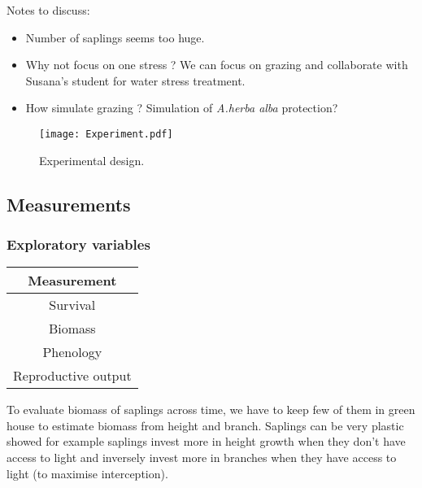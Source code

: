 \documentclass[12pt]{article} %
\begin{document}
Notes to discuss:
\begin{itemize}
	\item Number of saplings seems too huge.
	\item Why not focus on one stress ? We can focus on grazing and collaborate with Susana's student for water stress treatment.
	\item How simulate grazing ? Simulation of \textit{A.herba alba} protection?
\end{itemize}

\begin{figure} %
\begin{center}
\texttt{[image: Experiment.pdf]}
\end{center}
\caption{Experimental design.\label{exp}}
\end{figure}

\subsection{Measurements}

\subsubsection{Exploratory variables}
\begin{table}[h]
\begin{center}
\begin{tabular}{c}
Measurement \\ 
\hline
Survival \\ 
Biomass \\ 
Phenology \\ 
Reproductive output \\
\hline 
\end{tabular}
\end{center}
\end{table} 
To evaluate biomass of saplings across time, we have to keep few of them in green house to estimate biomass from height and branch. Saplings can be very plastic \citep{Bonser1994} showed for example saplings invest more in height growth when they don't have access to light and inversely invest more in branches when they have access to light (to maximise interception). 
\end{document}
